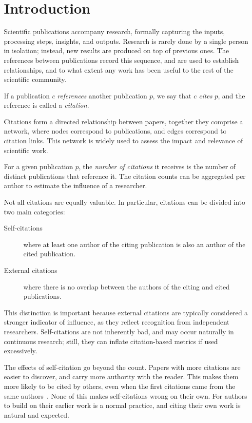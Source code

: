 
\chapter{Introduction} \label{c1:intro}

Scientific publications accompany research, formally capturing the inputs, processing steps, insights, and outputs.
Research is rarely done by a single person in isolation; instead, new results are produced on top of previous ones.
The references between publications record this sequence, and are used to establish relationships, and to what extent any work has been useful to the rest of the scientific community.

If a publication $c$ \emph{references} another publication $p$, we say that $c$ \emph{cites} $p$, and the reference is called a \emph{citation}.

Citations form a directed relationship between papers, together they comprise a network, where nodes correspond to publications, and edges correspond to citation links.
This network is widely used to assess the impact and relevance of scientific work.

For a given publication $p$, the \emph{number of citations} it receives is the number of distinct publications that reference it.
The citation counts can be aggregated per author to estimate the influence of a researcher.

Not all citations are equally valuable.
In particular, citations can be divided into two main categories:

\begin{description}
\item
[Self-citations] where at least one author of the citing publication is also an author of the cited publication.
\item
[External citations] where there is no overlap between the authors of the citing and cited publications.
\end{description}


This distinction is important because external citations are typically considered a stronger indicator of influence, as they reflect recognition from independent researchers.
Self-citations are not inherently bad, and may occur naturally in continuous research; still, they can inflate citation-based metrics if used excessively.

The effects of self-citation go beyond the count.
Papers with more citations are easier to discover, and carry more authority with the reader.
This makes them more likely to be cited by others, even when the first citations came from the same authors~\cite{Fowler2007, R2008ImpactReinforcing}.
None of this makes self-citations wrong on their own.
For authors to build on their earlier work is a normal practice, and citing their own work is natural and expected.

